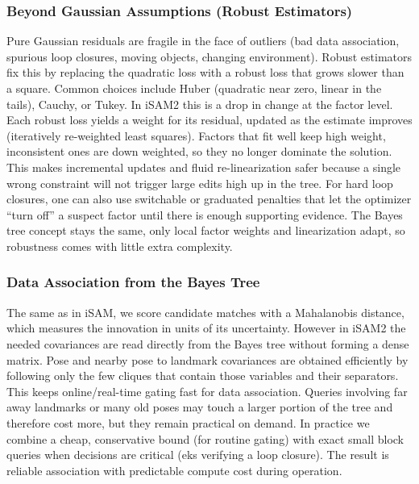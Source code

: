 \subsubsection{Beyond Gaussian Assumptions (Robust Estimators)}
Pure Gaussian residuals are fragile in the face of outliers (bad data association, spurious loop closures, moving objects, changing environment). Robust estimators fix this by replacing the quadratic loss with a robust loss that grows slower than a square. Common choices include Huber (quadratic near zero, linear in the tails), Cauchy, or Tukey. In iSAM2 this is a drop in change at the factor level. Each robust loss yields a weight for its residual, updated as the estimate improves (iteratively re-weighted least squares). Factors that fit well keep high weight, inconsistent ones are down weighted, so they no longer dominate the solution. This makes incremental updates and fluid re-linearization safer because a single wrong constraint will not trigger large edits high up in the tree. For hard loop closures, one can also use switchable or graduated penalties that let the optimizer ``turn off'' a suspect factor until there is enough supporting evidence. The Bayes tree concept stays the same, only local factor weights and linearization adapt, so robustness comes with little extra complexity.



\subsubsection{Data Association from the Bayes Tree}
The same as in iSAM, we score candidate matches with a Mahalanobis distance, which measures the innovation in units of its uncertainty. However in iSAM2 the needed covariances are read directly from the Bayes tree without forming a dense matrix. Pose and nearby pose to landmark covariances are obtained efficiently by following only the few cliques that contain those variables and their separators. This keeps online/real-time gating fast for data association. Queries involving far away landmarks or many old poses may touch a larger portion of the tree and therefore cost more, but they remain practical on demand. In practice we combine a cheap, conservative bound (for routine gating) with exact small block queries when decisions are critical (eks verifying a loop closure). The result is reliable association with predictable compute cost during operation.



